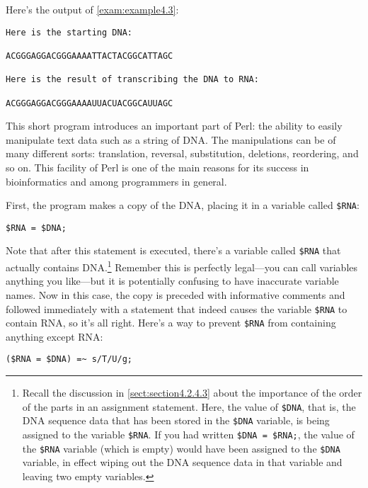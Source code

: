 

Here's the output of \autoref{exam:example4.3}:

\begin{lstlisting}
Here is the starting DNA:

ACGGGAGGACGGGAAAATTACTACGGCATTAGC

Here is the result of transcribing the DNA to RNA:

ACGGGAGGACGGGAAAAUUACUACGGCAUUAGC
\end{lstlisting}

This short program introduces an important part of Perl: the ability to easily manipulate text data such as a string of DNA. The manipulations can be of many different sorts: translation, reversal, substitution, deletions, reordering, and so on. This facility of Perl is one of the main reasons for its success in bioinformatics and among programmers in general.

First, the program makes a copy of the DNA, placing it in a variable called \verb|$RNA|:

\begin{lstlisting}
$RNA = $DNA;
\end{lstlisting}

Note that after this statement is executed, there's a variable called \verb|$RNA| that actually contains DNA.\footnote{Recall the discussion in \autoref{sect:section4.2.4.3} about the importance of the order of the parts in an assignment statement. Here, the value of \verb|$DNA|, that is, the DNA sequence data that has been stored in the \verb|$DNA| variable, is being assigned to the variable \verb|$RNA|. If you had written \verb|$DNA = $RNA;|, the value of the \verb|$RNA| variable (which is empty) would have been assigned to the \verb|$DNA| variable, in effect wiping out the DNA sequence data in that variable and leaving two empty variables.} Remember this is perfectly legal—you can call variables anything you like—but it is potentially confusing to have inaccurate variable names. Now in this case, the copy is preceded with informative comments and followed immediately with a statement that indeed causes the variable \verb|$RNA| to contain RNA, so it's all right. Here's a way to prevent \verb|$RNA| from containing anything except RNA: 

\begin{lstlisting}
($RNA = $DNA) =~ s/T/U/g;
\end{lstlisting}

